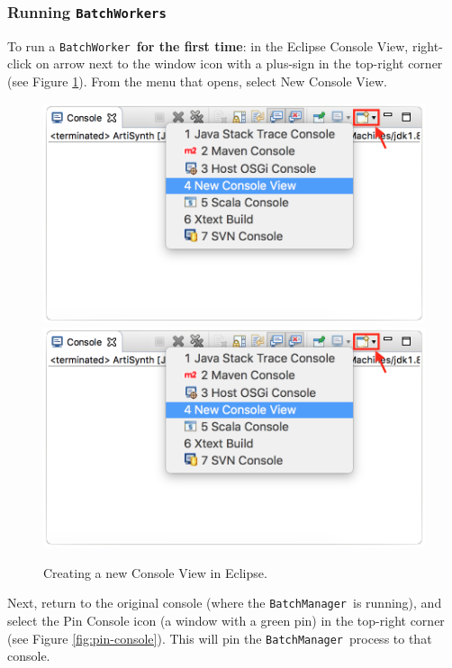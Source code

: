 \documentclass{article}
\newcommand{\BM}{{\tt BatchManager}}
\newcommand{\BW}{{\tt BatchWorker}}
\newcommand{\BWs}{{\tt BatchWorkers}}
\begin{document}
\subsubsection{Running \BWs}

To run a \BW\ \textbf{for the first time}: in the Eclipse {\sf Console View}, right-click on arrow next to the window icon with a plus-sign in the top-right corner (see Figure \ref{fig:new-console}). From the menu that opens, select {\sf New Console View}.

\begin{figure}[t]
\begin{center}
\iflatexml
 \includegraphics[]{images/batch-worker-launch-1}
\else
 \includegraphics[width=6in]{images/batch-worker-launch-1}
\fi
\end{center}
\caption{Creating a new Console View in Eclipse.}
\label{fig:new-console}
\end{figure}

Next, return to the original console (where the \BM\ is running), and select the {\sf Pin Console} icon (a window with a green pin) in the top-right corner (see Figure \ref{fig:pin-console}). This will pin the \BM\ process to that console.
\end{document}
